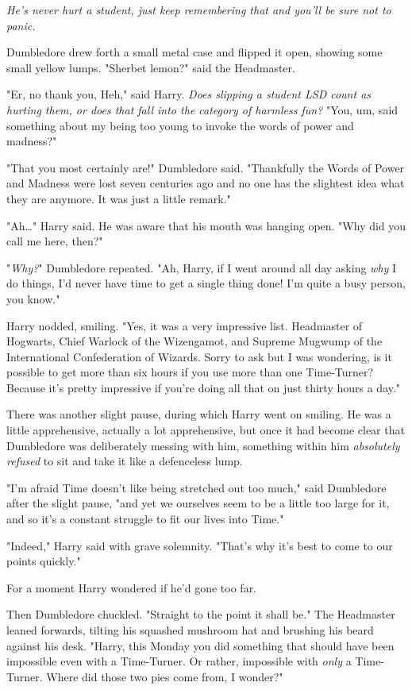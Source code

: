 \emph{He's never hurt a student, just keep remembering that and you'll be sure
not to panic.}

Dumbledore drew forth a small metal case and flipped it open, showing some
small yellow lumps. "Sherbet lemon?" said the Headmaster.

"Er, no thank you, Heh," said Harry. \emph{Does slipping a student LSD count as
hurting them, or does that fall into the category of harmless fun?} "You, um,
said something about my being too young to invoke the words of power and
madness?"

"That you most certainly are!" Dumbledore said. "Thankfully the Words of Power
and Madness were lost seven centuries ago and no one has the slightest idea
what they are anymore. It was just a little remark."

"Ah{\ldots}" Harry said. He was aware that his mouth was hanging open. "Why did
you call me here, then?"

"\emph{Why?}" Dumbledore repeated. "Ah, Harry, if I went around all day asking
\emph{why} I do things, I'd never have time to get a single thing done! I'm
quite a busy person, you know."

Harry nodded, smiling. "Yes, it was a very impressive list. Headmaster of
Hogwarts, Chief Warlock of the Wizengamot, and Supreme Mugwump of the
International Confederation of Wizards. Sorry to ask but I was wondering, is it
possible to get more than six hours if you use more than one Time-Turner?
Because it's pretty impressive if you're doing all that on just thirty hours a
day."

There was another slight pause, during which Harry went on smiling. He was a
little apprehensive, actually a lot apprehensive, but once it had become clear
that Dumbledore was deliberately messing with him, something within him
\emph{absolutely refused} to sit and take it like a defenceless lump.

"I'm afraid Time doesn't like being stretched out too much," said Dumbledore
after the slight pause, "and yet we ourselves seem to be a little too large for
it, and so it's a constant struggle to fit our lives into Time."

"Indeed," Harry said with grave solemnity. "That's why it's best to come to our
points quickly."

For a moment Harry wondered if he'd gone too far.

Then Dumbledore chuckled. "Straight to the point it shall be." The Headmaster
leaned forwards, tilting his squashed mushroom hat and brushing his beard
against his desk. "Harry, this Monday you did something that should have been
impossible even with a Time-Turner. Or rather, impossible with \emph{only} a
Time-Turner. Where did those two pies come from, I wonder?"

